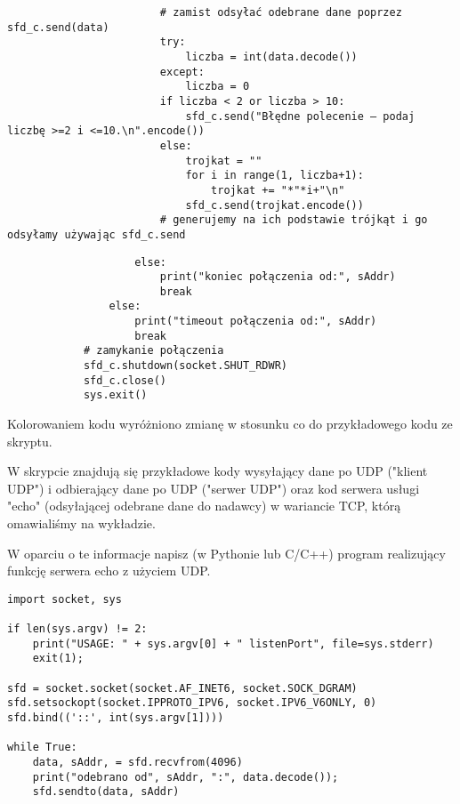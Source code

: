\begin{verbatim}
                        # zamist odsyłać odebrane dane poprzez sfd_c.send(data)
                        try:
                            liczba = int(data.decode())
                        except:
                            liczba = 0
                        if liczba < 2 or liczba > 10:
                            sfd_c.send("Błędne polecenie – podaj liczbę >=2 i <=10.\n".encode())
                        else:
                            trojkat = ""
                            for i in range(1, liczba+1):
                                trojkat += "*"*i+"\n"
                            sfd_c.send(trojkat.encode())
                        # generujemy na ich podstawie trójkąt i go odsyłamy używając sfd_c.send
\end{verbatim}
\begin{Verbatim}
                    else:
                        print("koniec połączenia od:", sAddr)
                        break
                else:
                    print("timeout połączenia od:", sAddr)
                    break
            # zamykanie połączenia
            sfd_c.shutdown(socket.SHUT_RDWR)
            sfd_c.close()
            sys.exit()
\end{Verbatim}
Kolorowaniem kodu wyróżniono zmianę w stosunku co do przykładowego kodu ze skryptu.
\fi


\dbEntryCheckResults
W skrypcie znajdują się przykładowe kody wysyłający dane po UDP ("klient UDP") i odbierający dane po UDP ("serwer UDP")
oraz kod serwera usługi "echo" (odsyłającej odebrane dane do nadawcy) w wariancie TCP, którą omawialiśmy na wykładzie.

W oparciu o te informacje napisz (w Pythonie lub C/C++) program realizujący funkcję serwera echo z użyciem UDP.
\fi

\dbEntryCheckResults
\begin{verbatim}
import socket, sys

if len(sys.argv) != 2:
    print("USAGE: " + sys.argv[0] + " listenPort", file=sys.stderr)
    exit(1);

sfd = socket.socket(socket.AF_INET6, socket.SOCK_DGRAM)
sfd.setsockopt(socket.IPPROTO_IPV6, socket.IPV6_V6ONLY, 0)
sfd.bind(('::', int(sys.argv[1])))

while True:
    data, sAddr, = sfd.recvfrom(4096)
    print("odebrano od", sAddr, ":", data.decode());
    sfd.sendto(data, sAddr)
\end{verbatim}
\fi



